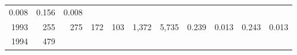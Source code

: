 \documentclass[]{article}
\begin{document}
\begin{longtable}[]{@{}rrrrrrrrrrr@{}}
\begin{minipage}[t]{0.05\columnwidth}
0.008\strut
\end{minipage} & \begin{minipage}[t]{0.10\columnwidth}\raggedleft\strut
0.156\strut
\end{minipage} & \begin{minipage}[t]{0.04\columnwidth}\raggedleft\strut
0.008\strut
\end{minipage}\tabularnewline
\begin{minipage}[t]{0.06\columnwidth}\raggedleft\strut
1993\strut
\end{minipage} & \begin{minipage}[t]{0.07\columnwidth}\raggedleft\strut
255\strut
\end{minipage} & \begin{minipage}[t]{0.07\columnwidth}\raggedleft\strut
275\strut
\end{minipage} & \begin{minipage}[t]{0.07\columnwidth}\raggedleft\strut
172\strut
\end{minipage} & \begin{minipage}[t]{0.07\columnwidth}\raggedleft\strut
103\strut
\end{minipage} & \begin{minipage}[t]{0.07\columnwidth}\raggedleft\strut
1,372\strut
\end{minipage} & \begin{minipage}[t]{0.05\columnwidth}\raggedleft\strut
5,735\strut
\end{minipage} & \begin{minipage}[t]{0.09\columnwidth}\raggedleft\strut
0.239\strut
\end{minipage} & \begin{minipage}[t]{0.05\columnwidth}\raggedleft\strut
0.013\strut
\end{minipage} & \begin{minipage}[t]{0.10\columnwidth}\raggedleft\strut
0.243\strut
\end{minipage} & \begin{minipage}[t]{0.04\columnwidth}\raggedleft\strut
0.013\strut
\end{minipage}\tabularnewline
\begin{minipage}[t]{0.06\columnwidth}\raggedleft\strut
1994\strut
\end{minipage} & \begin{minipage}[t]{0.07\columnwidth}\raggedleft\strut
479\strut
\end{minipage} & \begin{minipage}[t]{0.07\columnwidth}\raggedleft\strut

\end{minipage}
\end{longtable}
\end{document}

